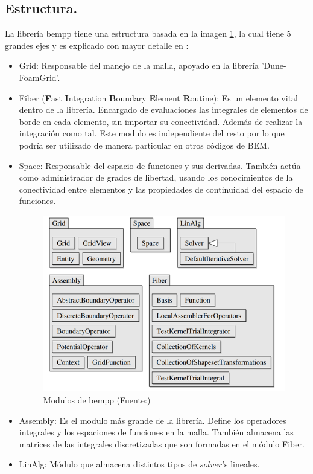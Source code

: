 \documentclass[11pt]{article}
\begin{document}
\subsection{Estructura.}
La librería bempp tiene una estructura basada en la imagen \ref{fig:Estructura BEM}, la cual tiene 5 grandes ejes y es explicado con mayor detalle en \cite{Solvingwithbempp}:
\begin{itemize}
\item Grid: Responsable del manejo de la malla, apoyado en la librería 'Dune-FoamGrid'.
\item Fiber (\textbf{F}ast \textbf{I}ntegration \textbf{B}oundary \textbf{E}lement \textbf{R}outine): Es un elemento vital dentro de la librería. Encargado de evaluaciones las integrales de elementos de borde en cada elemento, sin importar su conectividad. Además de realizar la integración como tal. Este modulo es independiente del resto por lo que podría ser utilizado de manera particular en otros códigos de BEM.
\item Space: Responsable del espacio de funciones y sus derivadas. También actúa como administrador de grados de libertad, usando los conocimientos de la conectividad entre elementos y las propiedades de continuidad del espacio de funciones.
\begin{figure}[H]
\centering
\includegraphics[scale=0.7]{Imagenes/estructurabempp.png}
\caption{Modulos de bempp (Fuente:\cite{Solvingwithbempp})}\label{fig:Estructura BEM}
\end{figure}
\item Assembly: Es el modulo más grande de la librería. Define los operadores integrales y los espaciones de funciones en la malla. También almacena las matrices de las integrales discretizadas que son formadas en el módulo Fiber.
\item LinAlg: Módulo que almacena distintos tipos de $solver$'s lineales. 
\end{itemize} 
\end{document}
